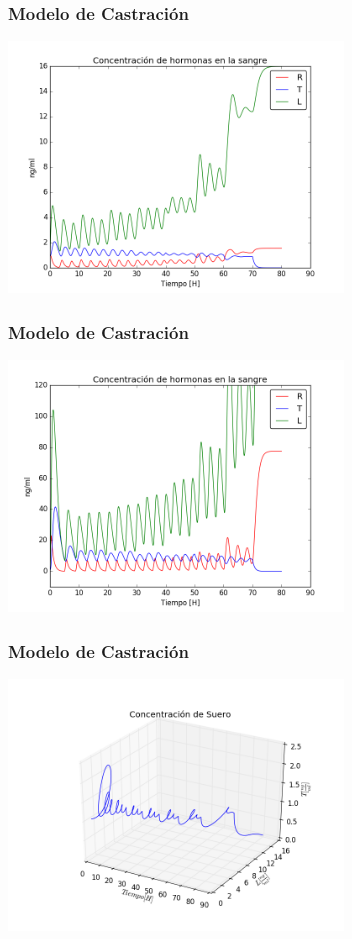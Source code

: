 \documentclass[10pt]{beamer}
\begin{document}
\begin{frame}
\frametitle{Modelo de Castración}
\begin{center}
 \includegraphics[width=3.5in]{imagenes/Graficas/Castracion/castracion_hormonas_primer_modelo_m_12.png}
\end{center}
\end{frame}

\begin{frame}
\frametitle{Modelo de Castración}
\begin{center}
 \includegraphics[width=3.5in]{imagenes/Graficas/Castracion/castracion_hormonas_segundo_modelo.png}
\end{center}
\end{frame}

\begin{frame}
\frametitle{Modelo de Castración}
\begin{center}
 \includegraphics[width=3.5in]{imagenes/Graficas/Castracion/castracion_suero_primer_modelo_m_8.png}
\end{center}
\end{frame}
\end{document}
